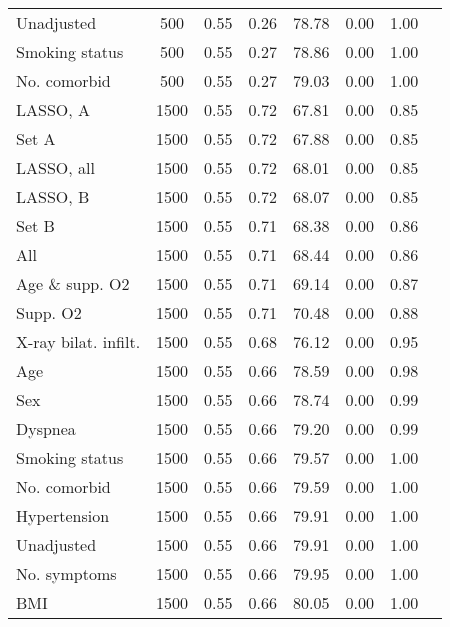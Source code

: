 \documentclass{article}
\begin{document}
{\begin{longtable}{lccccccc}
Unadjusted & 500 & 0.55 & 0.26 & 78.78 & 0.00 & 1.00\\
Smoking status & 500 & 0.55 & 0.27 & 78.86 & 0.00 & 1.00\\
No. comorbid & 500 & 0.55 & 0.27 & 79.03 & 0.00 & 1.00\\ \midrule
LASSO, A & 1500 & 0.55 & 0.72 & 67.81 & 0.00 & 0.85\\
Set A & 1500 & 0.55 & 0.72 & 67.88 & 0.00 & 0.85\\
LASSO, all & 1500 & 0.55 & 0.72 & 68.01 & 0.00 & 0.85\\
LASSO, B & 1500 & 0.55 & 0.72 & 68.07 & 0.00 & 0.85\\
Set B & 1500 & 0.55 & 0.71 & 68.38 & 0.00 & 0.86\\
All & 1500 & 0.55 & 0.71 & 68.44 & 0.00 & 0.86\\
Age \& supp. O2 & 1500 & 0.55 & 0.71 & 69.14 & 0.00 & 0.87\\
Supp. O2 & 1500 & 0.55 & 0.71 & 70.48 & 0.00 & 0.88\\
X-ray bilat. infilt. & 1500 & 0.55 & 0.68 & 76.12 & 0.00 & 0.95\\
Age & 1500 & 0.55 & 0.66 & 78.59 & 0.00 & 0.98\\
Sex & 1500 & 0.55 & 0.66 & 78.74 & 0.00 & 0.99\\
Dyspnea & 1500 & 0.55 & 0.66 & 79.20 & 0.00 & 0.99\\
Smoking status & 1500 & 0.55 & 0.66 & 79.57 & 0.00 & 1.00\\
No. comorbid & 1500 & 0.55 & 0.66 & 79.59 & 0.00 & 1.00\\
Hypertension & 1500 & 0.55 & 0.66 & 79.91 & 0.00 & 1.00\\
Unadjusted & 1500 & 0.55 & 0.66 & 79.91 & 0.00 & 1.00\\
No. symptoms & 1500 & 0.55 & 0.66 & 79.95 & 0.00 & 1.00\\
BMI & 1500 & 0.55 & 0.66 & 80.05 & 0.00 & 1.00\\\bottomrule
\hline
\end{longtable}
}

\clearpage
\end{document}
